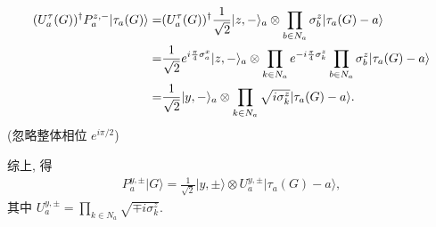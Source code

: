 \documentclass{assignment}
\begin{document}
\begin{pf}
\begin{itemize}
        \begin{align}
            \notag(U_a^{\tau}(G))^{\dagger}P_a^{z,-}\lvert\tau_a(G)\rangle=&(U_a^{\tau}(G))^{\dagger}\frac{1}{\sqrt{2}}\lvert z,-\rangle_a\otimes\prod_{b\in N_a}\sigma_b^z\lvert\tau_a(G)-a\rangle\\
            \notag=&\frac{1}{\sqrt{2}}e^{i\frac{\pi}{4}\sigma_a^x}\lvert z,-\rangle_a\otimes\prod_{k\in N_a}e^{-i\frac{\pi}{4}\sigma_k^z}\prod_{b\in N_a}\sigma_b^z\lvert\tau_a(G)-a\rangle\\
            \notag=&\frac{1}{\sqrt{2}}\lvert y,-\rangle_a\otimes\prod_{k\in N_a}\sqrt{i\sigma_k^z}\lvert\tau_a(G)-a\rangle.
        \end{align}
        (忽略整体相位 $e^{i\pi/2}$)
    \end{itemize}
    综上, 得
    \begin{align}
        P_a^{y,\pm}\lvert G\rangle=\frac{1}{\sqrt{2}}\lvert y,\pm\rangle\otimes U_a^{y,\pm}\lvert\tau_a(G)-a\rangle,
    \end{align}
    其中 $U_a^{y,\pm}=\prod_{k\in N_a}\sqrt{\mp i\sigma_k^z}$.


\end{pf}
\end{document}
